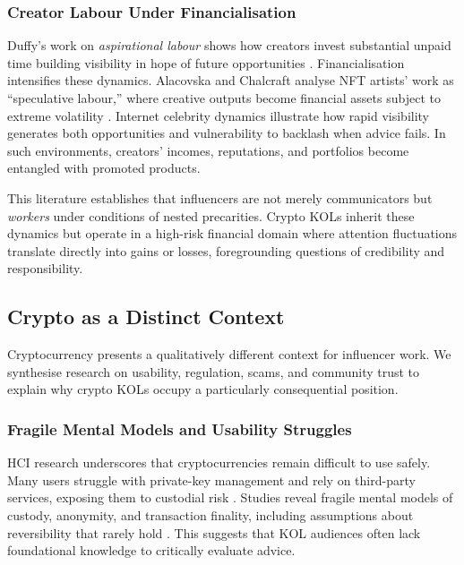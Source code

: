 \subsubsection{Creator Labour Under Financialisation}

Duffy's work on \emph{aspirational labour} shows how creators invest substantial unpaid time building visibility in hope of future opportunities \cite{DuffyAspirationalWork2017}. Financialisation intensifies these dynamics. Alacovska and Chalcraft analyse NFT artists' work as ``speculative labour,'' where creative outputs become financial assets subject to extreme volatility \cite{AlacovskaSpeculativeLabour2024}. Internet celebrity dynamics \cite{AbidinInternetCelebrity2018} illustrate how rapid visibility generates both opportunities and vulnerability to backlash when advice fails. In such environments, creators' incomes, reputations, and portfolios become entangled with promoted products.

This literature establishes that influencers are not merely communicators but \emph{workers} under conditions of nested precarities. Crypto KOLs inherit these dynamics but operate in a high-risk financial domain where attention fluctuations translate directly into gains or losses, foregrounding questions of credibility and responsibility.

\subsection{Crypto as a Distinct Context}

Cryptocurrency presents a qualitatively different context for influencer work. We synthesise research on usability, regulation, scams, and community trust to explain why crypto KOLs occupy a particularly consequential position.

\subsubsection{Fragile Mental Models and Usability Struggles}

HCI research underscores that cryptocurrencies remain difficult to use safely. Many users struggle with private-key management and rely on third-party services, exposing them to custodial risk \cite{MoserBitcoinUsability2013,Krombholz2016}. Studies reveal fragile mental models of custody, anonymity, and transaction finality, including assumptions about reversibility that rarely hold \cite{Mai2020,Abramova2021}. This suggests that KOL audiences often lack foundational knowledge to critically evaluate advice.

